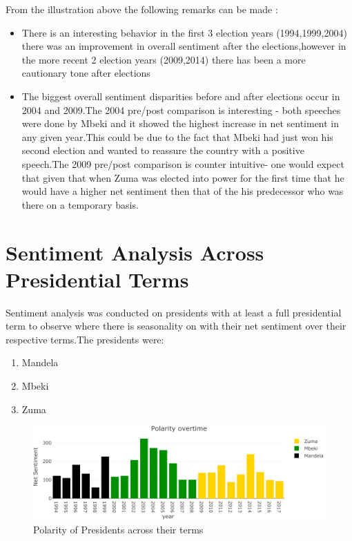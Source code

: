 \documentclass[]{article}
\begin{document}
From the illustration above the following remarks can be made :

\begin{itemize}

\item There is an interesting behavior in the first 3 election years (1994,1999,2004) there was an improvement in overall sentiment after the elections,however in the more recent 2 election years (2009,2014) there has been a more cautionary tone after elections  
\item The biggest  overall sentiment disparities before and after elections occur in 2004 and 2009.The 2004 pre/post comparison is interesting - both speeches were done by Mbeki and it showed the highest increase in net sentiment in any given year.This could be due to the fact that Mbeki had just won his second election and wanted to reassure the country with a positive speech.The 2009 pre/post comparison is counter intuitive-  one would expect that given that when Zuma was elected into power for the first time that he would have a higher net sentiment then that of the his predecessor who was there on a temporary basis.

\end{itemize}

\section{Sentiment Analysis Across Presidential Terms}

Sentiment analysis was conducted on presidents with at least a full
presidential term to observe where there is seasonality on with their
net sentiment over their respective terms.The presidents were:

\begin{enumerate}
\item Mandela
\item Mbeki
\item Zuma
\end{enumerate}

\begin{figure}[H]

{\centering \includegraphics{datasci_fi_Assignment_2_files/figure-latex/Mandela_Mbeki_Zuma-1} 

}

\caption{Polarity of Presidents across their terms}\label{fig:Mandela_Mbeki_Zuma}
\end{figure}
\end{document}
